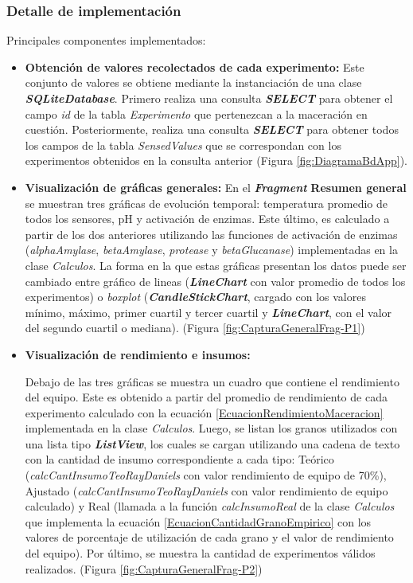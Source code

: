             \subsubsection{Detalle de implementación}
             \par Principales componentes implementados:
             \begin{itemize}%
                 \item \textbf{Obtención de valores recolectados de cada experimento:} Este conjunto de valores se obtiene mediante la instanciación de una clase \textbf{\textit{\gls{SQLiteDatabase}}}. Primero realiza una consulta \textbf{\textit{\gls{SELECT}}} para obtener el campo \textit{id} de la tabla \textit{Experimento} que pertenezcan a la maceración en cuestión. Posteriormente, realiza una consulta \textbf{\textit{\gls{SELECT}}} para obtener todos los campos de la tabla \textit{SensedValues} que se correspondan con los experimentos obtenidos en la consulta anterior (Figura \ref{fig:DiagramaBdApp}).
                 
                 \item \textbf{Visualización de gráficas generales:} En el \textbf{\textit{\gls{Fragment}}} \textbf{Resumen general} se muestran tres gráficas de evolución temporal: temperatura promedio de todos los sensores, pH y activación de enzimas. Este último, es calculado a partir de los dos anteriores utilizando las funciones de activación de enzimas (\textit{alphaAmylase}, \textit{betaAmylase}, \textit{protease} y \textit{betaGlucanase}) implementadas en la clase \textit{Calculos}. La forma en la que estas gráficas presentan los datos puede ser cambiado entre gráfico de lineas (\textbf{\textit{\gls{LineChart}}} con valor promedio de todos los experimentos) o \textit{boxplot} (\textbf{\textit{\gls{CandleStickChart}}}, cargado con los valores mínimo, máximo, primer cuartil y tercer cuartil y \textbf{\textit{\gls{LineChart}}}, con el valor del segundo cuartil o mediana). (Figura \ref{fig:CapturaGeneralFrag-P1})
                 
                 \item \textbf{Visualización de rendimiento e insumos:} \par Debajo de las tres gráficas se muestra un cuadro que contiene el rendimiento del equipo. Este es obtenido a partir del promedio de rendimiento de cada experimento calculado con la ecuación \ref{EcuacionRendimientoMaceracion} implementada en la clase \textit{Calculos}. Luego, se listan los granos utilizados con una lista tipo \textbf{\textit{\gls{ListView}}}, los cuales se cargan utilizando una cadena de texto con la cantidad de insumo correspondiente a cada tipo: Teórico (\textit{calcCantInsumoTeoRayDaniels} con valor rendimiento de equipo de 70\%), Ajustado (\textit{calcCantInsumoTeoRayDaniels} con valor rendimiento de equipo calculado) y Real (llamada a la función \textit{calcInsumoReal} de la clase \textit{Calculos} que implementa la ecuación  \ref{EcuacionCantidadGranoEmpirico} con los valores de porcentaje de utilización de cada grano y el valor de rendimiento del equipo). Por último, se muestra la cantidad de experimentos válidos realizados. (Figura \ref{fig:CapturaGeneralFrag-P2})
                 

\end{itemize}
